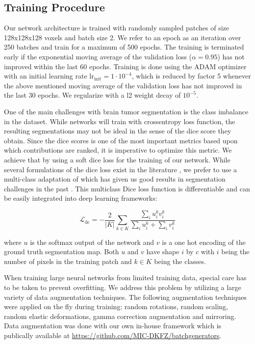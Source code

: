 \documentclass{templates/llncs} %
\begin{document}
	\subsection{Training Procedure}
	\label{training_procedure}
	Our network architecture is trained with randomly sampled patches of size 128x128x128 voxels and batch size 2. We refer to an epoch as an iteration over 250 batches and train for a maximum of 500 epochs. The training is terminated early if the exponential moving average of the validation loss ($\alpha = 0.95$) has not improved within the last 60 epochs. Training is done using the ADAM optimizer with an initial learning rate $\mathrm{lr_{init}} = 1 \cdot 10^{-4}$, which is reduced by factor 5 whenever the above mentioned moving average of the validation loss has not improved in the last 30 epochs. We regularize with a l2 weight decay of $10^{-5}$.
	
	One of the main challenges with brain tumor segmentation is the class imbalance in the dataset. While networks will train with crossentropy loss function, the resulting segmentations may not be ideal in the sense of the dice score they obtain. Since the dice scores is one of the most important metrics based upon which contributions are ranked, it is imperative to optimize this metric. We achieve that by using a soft dice loss for the training of our network. While several formulations of the dice loss exist in the literature \cite{sudre2017generalised,drozdzal2016importance,milletari2016v}, we prefer to use a multi-class adaptation of \cite{drozdzal2016importance} which has given us good results in segmentation challenges in the past \cite{isensee2017automatic,isensee2017brain}. This multiclass Dice loss function is differentiable and can be easily integrated into deep learning frameworks:

	\begin{equation}
	  \mathcal{L}_\mathrm{dc} = - \frac{2}{|K|} \sum_{k\in K}\frac{\sum_i u_i^k v_i^k}{\sum_i u_i^k + \sum_i v_i^k}
	\end{equation}
	
	where $u$ is the softmax output of the network and $v$ is a one hot encoding of the ground truth segmentation map. Both $u$ and $v$ have shape $i$ by $c$ with $i$ being the number of pixels in the training patch and $k\in K$ being the classes.
	
  When training large neural networks from limited training data, special care has to be taken to prevent overfitting. We address this problem by utilizing a large variety of data augmentation techniques. The following augmentation techniques were applied on the fly during training: random rotations, random scaling, random elastic deformations, gamma correction augmentation and mirroring. Data augmentation was done with our own in-house framework which is publically available at \href{https://github.com/MIC-DKFZ/batchgenerators}{https://github.com/MIC-DKFZ/batchgenerators}.
  
\end{document}

